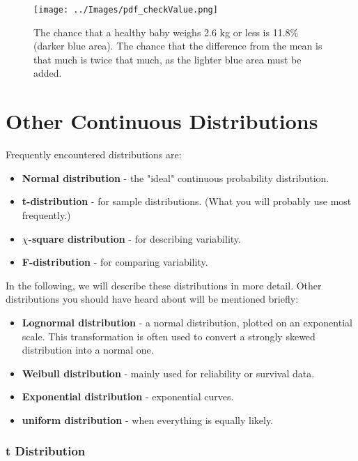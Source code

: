 \begin{figure}
  \centering
  \texttt{[image: ../Images/pdf\_checkValue.png]}\\
  \caption{The chance that a healthy baby weighs 2.6 kg or less is 11.8\% (darker blue area). The chance that the difference from the mean is that much is twice that much, as the lighter blue area must be added.}\label{fig:pdf_checkValue}
\end{figure}

\section{Other Continuous Distributions}\label{sec:ContinuousDistributions} 

Frequently encountered distributions are:

\begin{itemize}
  \item \textbf{Normal distribution} - the "ideal" continuous probability distribution.
  \item \textbf{t-distribution} - for sample distributions. (What you will probably use most frequently.)
  \item \textbf{$\chi$-square distribution} - for describing  variability.
  \item \textbf{F-distribution} - for comparing variability.
\end{itemize}

In the following, we will describe these distributions in more detail. Other distributions you should have heard about will be mentioned briefly:

\begin{itemize}
  \item \textbf{Lognormal distribution} - a normal distribution, plotted on an exponential scale. This transformation is often used to convert a strongly skewed distribution into a normal one.
  \item \textbf{Weibull distribution} - mainly used for reliability or survival data.
  \item \textbf{Exponential distribution} - exponential curves.
  \item \textbf{uniform distribution} - when everything is equally likely.
\end{itemize}

\subsubsection{t Distribution}

